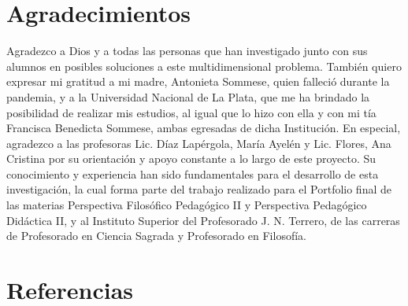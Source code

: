 \documentclass{article}
\begin{document}
\section{\fontsize{12pt}{14pt} Agradecimientos}

{\changefontsizes{8.9pt}
Agradezco a Dios y a todas las personas que han investigado junto con sus alumnos en posibles soluciones a este multidimensional problema. También quiero expresar mi gratitud a mi madre, Antonieta Sommese, quien falleció durante la pandemia, y a la Universidad Nacional de La Plata, que me ha brindado la posibilidad de realizar mis estudios, al igual que lo hizo con ella y con mi tía Francisca Benedicta Sommese, ambas egresadas de dicha Institución.
En especial, agradezco a las profesoras Lic. Díaz Lapérgola, María Ayelén y Lic. Flores, Ana Cristina por su orientación y apoyo constante a lo largo de este proyecto. Su conocimiento y experiencia han sido fundamentales para el desarrollo de esta investigación, la cual forma parte del trabajo realizado para el Portfolio final de las materias Perspectiva Filosófico Pedagógico II y Perspectiva Pedagógico Didáctica II, y al Instituto Superior del Profesorado J. N. Terrero, de las carreras de Profesorado en Ciencia Sagrada y Profesorado en Filosofía.}

\section{\fontsize{12pt}{14pt} Referencias}
\end{document}
